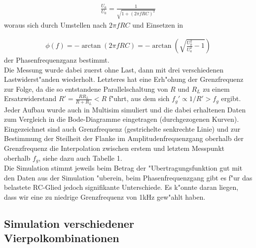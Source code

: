 \documentclass[10pt]{article}
\begin{document}
\begin{eqnarray}
 \frac{U_a}{U_0} = \frac{1}{\sqrt{1+(2\pi fRC)^2}}
\end{eqnarray}
\noindent
woraus sich durch Umstellen nach $2\pi fRC$ und Einsetzen in

\begin{eqnarray}
 \phi (f) = -\arctan(2\pi fRC) = -\arctan(\sqrt{\frac{U_0^2}{U_a^2}-1})
\end{eqnarray}
\noindent
der Phasenfrequenzganz bestimmt.\\

Die Messung wurde dabei zuerst ohne Last, dann mit drei verschiedenen Lastwiderst"anden wiederholt. Letzteres hat eine Erh"ohung der Grenzfrequenz zur Folge, da die so entstandene Parallelschaltung von $R$ und $R_L$ zu einem Ersatzwiderstand $R'=\frac{RR_L}{R+R_L}<R$ f"uhrt, aus dem sich $f_g'\propto{1/R'}>f_g$ ergibt.\\

Jeder Aufbau wurde auch in Multisim simuliert und die dabei erhaltenen Daten zum Vergleich in die Bode-Diagramme eingetragen (durchgezogenen Kurven). Eingezeichnet sind auch Grenzfrequenz (gestrichelte senkrechte Linie) und zur Bestimmung der Steilheit der Flanke im Amplitudenfrequenzgang oberhalb der Grenzfrequenz die Interpolation zwischen erstem und letztem Messpunkt oberhalb $f_g$, siehe dazu auch Tabelle 1.\\ %

Die Simulation stimmt jeweils beim Betrag der "Ubertragungsfunktion gut mit den Daten aus der Simulation "uberein, beim Phasenfrequenzgang gibt es f"ur das belastete RC-Glied jedoch signifikante Unterschiede. Es k"onnte daran liegen, dass wir eine zu niedrige Grenzfrequenz von 1kHz gew"ahlt haben.




%
\newpage
\subsection{Simulation verschiedener Vierpolkombinationen}
\end{document}
